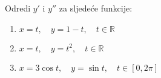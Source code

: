 \begin{example}
    Odredi $y'$ i $y''$ za sljedeće funkcije:

    \begin{enumerate}
        \item $x=t,\quad y=1-t,\quad t\in\mathbb{R}$
        \item $x=t,\quad y=t^2,\quad t\in\mathbb{R}$
        \item $x=3\cos t,\quad y=\sin t,\quad t\in[0, 2\pi]$
    \end{enumerate}
\end{example}

